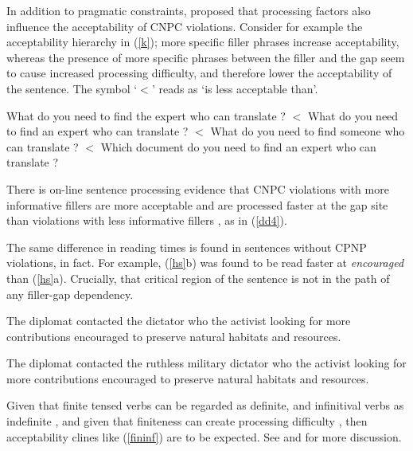 \documentclass[output=paper
                ,modfonts
                ,nonflat
	        ,collection
	        ,collectionchapter
	        ,collectiontoclongg
 	        ,biblatex
                ,babelshorthands
                ,newtxmath
                ,draftmode
                ,colorlinks, citecolor=brown
]{./langsci/langscibook}
\begin{document}
 
 
  
In addition to pragmatic constraints,  \citet{kluender92,kluender}  proposed that 
processing factors also  influence the acceptability of    CNPC violations.
Consider for example the acceptability hierarchy in  (\ref{k});  more specific filler phrases increase acceptability, whereas    the presence of more specific phrases between the filler and the gap seem  to cause increased processing difficulty, and therefore   lower the acceptability of the sentence.  The symbol `$<$' reads as `is less acceptable than'.

\eal \label{k}
\ex What do you need to find the expert who can translate \spc?  $<$
\ex What do you need to find an expert who can translate \spc?   $<$
\ex What do you need to find someone who can translate \spc? $<$
\ex Which document do you need to find an expert who can translate \spc?
\zl


\indent
There is on-line sentence processing evidence that   CNPC   violations  with more informative  fillers are more acceptable and are processed faster at the gap site than violations with less informative fillers \citep{hofsaglang}, as in  (\ref{dd4}).
 
\eal \label{dd4}
\zl



\noindent
The same difference in reading times  is found in sentences without CPNP violations, in fact. For example,  (\ref{hs}b) was found to be read faster at \emph{encouraged} than (\ref{hs}a). Crucially, that critical region of the sentence is not in the path of any filler-gap dependency.
 
\eal \label{hs}
 \ex The diplomat contacted the dictator who the activist looking for more contributions encouraged to preserve natural habitats and resources.
 
 \ex The diplomat contacted the ruthless military dictator who the activist looking for more contributions encouraged to preserve natural habitats and resources.
 \zl



Given that  finite tensed verbs can be regarded as definite, and infinitival verbs as indefinite \citep{partee84}, and given that finiteness can create processing difficulty 
 \citep{kluender92,gibson0000}, then acceptability clines like 
(\ref{fininf}) are to be expected. See \citet[Chapter 5]{levhubook} and \citet[308]{levine17} for more discussion.
\end{document}
